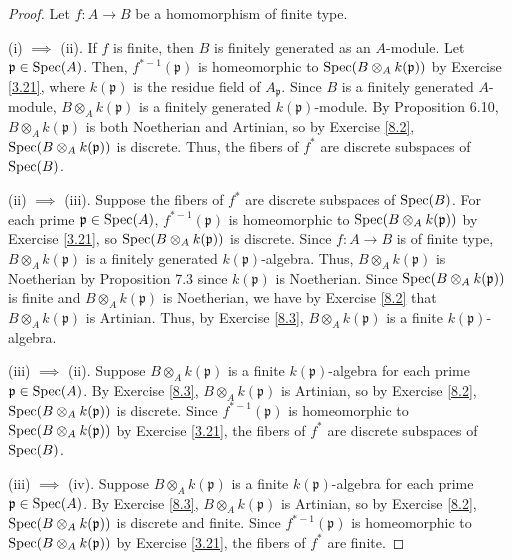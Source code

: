 \begin{proof}
Let $f : A \to B$ be a homomorphism of finite type.

(i) $\implies$ (ii). If $f$ is finite, then $B$ is finitely generated as an $A$-module. Let $\mathfrak{p} \in \operatorname{Spec}(A)$. Then, 
$f^{*-1}(\mathfrak{p})$ is homeomorphic to $\operatorname{Spec}(B \otimes_A k(\mathfrak{p}))$ by Exercise \ref{3.21}, where $k(\mathfrak{p})$ is the residue
field of $A_{\mathfrak{p}}$. Since $B$ is a finitely generated $A$-module, $B \otimes_A k(\mathfrak{p})$ is a finitely generated
$k(\mathfrak{p})$-module. By Proposition 6.10, $B \otimes_A k(\mathfrak{p})$ is both Noetherian and Artinian, so by Exercise \ref{8.2},
$\operatorname{Spec}(B \otimes_A k(\mathfrak{p}))$ is discrete. Thus, the fibers of $f^*$ are discrete subspaces of $\operatorname{Spec}(B)$.

(ii) $\implies$ (iii). Suppose the fibers of $f^*$ are discrete subspaces of $\operatorname{Spec}(B)$. For each prime $\mathfrak{p} \in \operatorname{Spec}(A)$, 
$f^{*-1}(\mathfrak{p})$ is homeomorphic to $\operatorname{Spec}(B \otimes_A k(\mathfrak{p}))$ by Exercise \ref{3.21}, so $\operatorname{Spec}(B \otimes_A k(\mathfrak{p}))$
is discrete. Since $f : A \to B$ is of finite type, $B \otimes_A k(\mathfrak{p})$ is a finitely generated $k(\mathfrak{p})$-algebra. Thus,
$B \otimes_A k(\mathfrak{p})$ is Noetherian by Proposition 7.3 since $k(\mathfrak{p})$ is Noetherian. Since $\operatorname{Spec}(B \otimes_A k(\mathfrak{p}))$
is finite and $B \otimes_A k(\mathfrak{p})$ is Noetherian, we have by Exercise \ref{8.2} that $B \otimes_A k(\mathfrak{p})$ is Artinian. Thus,
by Exercise \ref{8.3}, $B \otimes_A k(\mathfrak{p})$ is a finite $k(\mathfrak{p})$-algebra.

(iii) $\implies$ (ii). Suppose $B \otimes_A k(\mathfrak{p})$ is a finite $k(\mathfrak{p})$-algebra for each prime $\mathfrak{p} \in \operatorname{Spec}(A)$. By
Exercise \ref{8.3}, $B \otimes_A k(\mathfrak{p})$ is Artinian, so by Exercise \ref{8.2}, $\operatorname{Spec}(B \otimes_A k(\mathfrak{p}))$ is discrete. Since
$f^{*-1}(\mathfrak{p})$ is homeomorphic to $\operatorname{Spec}(B \otimes_A k(\mathfrak{p}))$ by Exercise \ref{3.21}, the fibers of $f^*$ are discrete subspaces
of $\operatorname{Spec}(B)$.

(iii) $\implies$ (iv). Suppose $B \otimes_A k(\mathfrak{p})$ is a finite $k(\mathfrak{p})$-algebra for each prime $\mathfrak{p} \in \operatorname{Spec}(A)$. By
Exercise \ref{8.3}, $B \otimes_A k(\mathfrak{p})$ is Artinian, so by Exercise \ref{8.2}, $\operatorname{Spec}(B \otimes_A k(\mathfrak{p}))$ is discrete and finite. 
Since $f^{*-1}(\mathfrak{p})$ is homeomorphic to $\operatorname{Spec}(B \otimes_A k(\mathfrak{p}))$ by Exercise \ref{3.21}, the fibers of $f^*$ are finite.
\end{proof}


